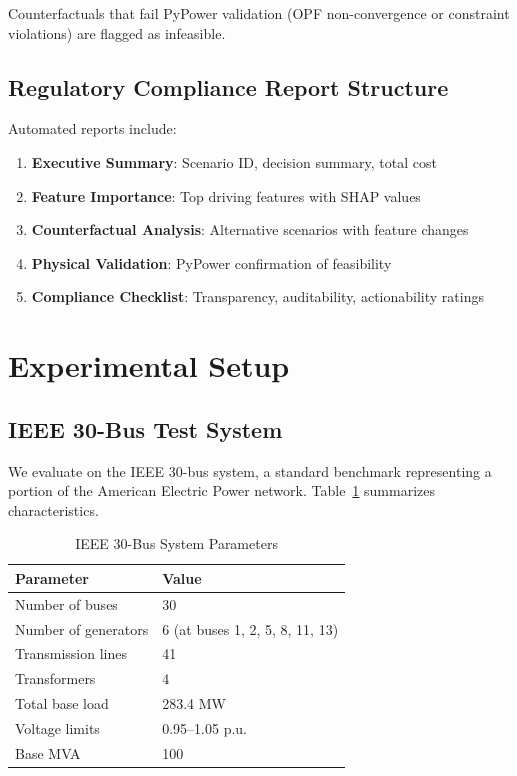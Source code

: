\documentclass[journal,12pt,onecolumn]{IEEEtran}
\begin{document}
Counterfactuals that fail PyPower validation (OPF non-convergence or constraint violations) are flagged as infeasible.

\subsection{Regulatory Compliance Report Structure}

Automated reports include:
\begin{enumerate}
    \item \textbf{Executive Summary}: Scenario ID, decision summary, total cost
    \item \textbf{Feature Importance}: Top driving features with SHAP values
    \item \textbf{Counterfactual Analysis}: Alternative scenarios with feature changes
    \item \textbf{Physical Validation}: PyPower confirmation of feasibility
    \item \textbf{Compliance Checklist}: Transparency, auditability, actionability ratings
\end{enumerate}

\section{Experimental Setup}
\label{sec:experimental}

\subsection{IEEE 30-Bus Test System}

We evaluate on the IEEE 30-bus system, a standard benchmark representing a portion of the American Electric Power network. Table~\ref{tab:system} summarizes characteristics.

\begin{table}[htbp]
\caption{IEEE 30-Bus System Parameters}
\label{tab:system}
\centering
\begin{tabular}{ll}
\toprule
\textbf{Parameter} & \textbf{Value} \\
\midrule
Number of buses & 30 \\
Number of generators & 6 (at buses 1, 2, 5, 8, 11, 13) \\
Transmission lines & 41 \\
Transformers & 4 \\
Total base load & 283.4 MW \\
Voltage limits & 0.95--1.05 p.u. \\
Base MVA & 100 \\
\bottomrule
\end{tabular}
\end{table}
\end{document}
